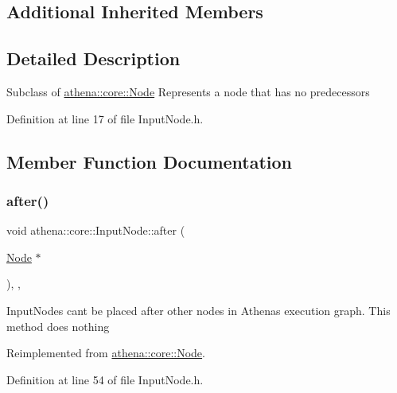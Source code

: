 \subsection*{Additional Inherited Members}


\subsection{Detailed Description}
Subclass of \mbox{\hyperlink{classathena_1_1core_1_1_node}{athena\+::core\+::\+Node}} Represents a node that has no predecessors 

Definition at line 17 of file Input\+Node.\+h.



\subsection{Member Function Documentation}
\mbox{\label{classathena_1_1core_1_1_input_node_aaec12f4c76b6d9890efe1fb4337a1b61}} 
\subsubsection{\texorpdfstring{after()}{after()}}
{\footnotesize\ttfamily void athena\+::core\+::\+Input\+Node\+::after (\begin{DoxyParamCaption}\item[{\mbox{\hyperlink{classathena_1_1core_1_1_node}{Node}} $\ast$}]{ }\end{DoxyParamCaption})\hspace{0.3cm}{\ttfamily [inline]}, {\ttfamily [override]}, {\ttfamily [virtual]}}

Input\+Nodes can\textquotesingle{}t be placed after other nodes in Athena\textquotesingle{}s execution graph. This method does nothing 

Reimplemented from \mbox{\hyperlink{classathena_1_1core_1_1_node_aefef588463c8e215e998415a7cc6b320}{athena\+::core\+::\+Node}}.



Definition at line 54 of file Input\+Node.\+h.

\mbox{\label{classathena_1_1core_1_1_input_node_a983588a56beeb817a59cf9b7e4a63b55}} 
